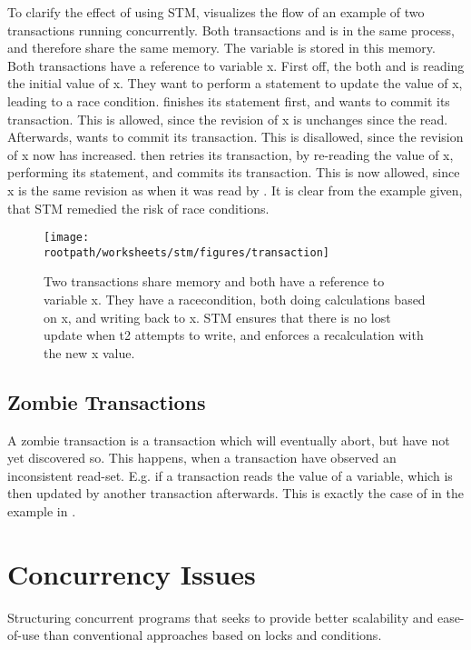 To clarify the effect of using \ac{STM},  visualizes the flow of an example of two transactions running concurrently. Both transactions  and  is in the same process, and therefore share the same memory. The variable  is stored in this memory. Both transactions have a reference to variable x. First off, the both  and  is reading the initial value of x. They want to perform a statement to update the value of x, leading to a race condition.  finishes its statement first, and wants to commit its transaction. This is allowed, since the revision of x is unchanges since the read. Afterwards,  wants to commit its transaction. This is disallowed, since the revision of x now has increased.  then retries its transaction, by re-reading the value of x, performing its statement, and commits its transaction. This is now allowed, since x is the same revision as when it was read by . It is clear from the example given, that \ac{STM} remedied the risk of race conditions.

\begin{figure}[h!]
\centering
\texttt{[image: \\rootpath/worksheets/stm/figures/transaction]}
\caption{Two transactions share memory and both have a reference to variable x. They have a racecondition, both doing calculations based on x, and writing back to x. \ac{STM} ensures that there is no lost update when t2 attempts to write, and enforces a recalculation with the new x value.}\label{fig:transaction}
\end{figure}

\subsection{Zombie Transactions}
A zombie transaction is a transaction which will eventually abort, but have not yet discovered so. This happens, when a transaction have observed an inconsistent read-set\cite[p. 196]{dice2006transactional}. E.g. if a transaction reads the value of a variable, which is then updated by another transaction afterwards. This is exactly the case of  in the example in .

\section{Concurrency Issues}
\label{sec:stm_issues}
Structuring concurrent programs that seeks to provide better scalability and ease-of-use than conventional approaches based on locks and conditions.

